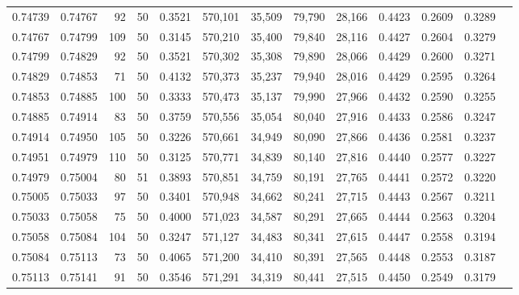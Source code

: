 \begin{tabular}{rrrrrrrrrrrrr}
0.74739 & 0.74767 &    92 &  50 &                                     0.3521 & 570,101 &  35,509 &  79,790 &  28,166 & 0.4423 & 0.2609 & 0.3289 \\
0.74767 & 0.74799 &   109 &  50 &                                     0.3145 & 570,210 &  35,400 &  79,840 &  28,116 & 0.4427 & 0.2604 & 0.3279 \\
0.74799 & 0.74829 &    92 &  50 &                                     0.3521 & 570,302 &  35,308 &  79,890 &  28,066 & 0.4429 & 0.2600 & 0.3271 \\
0.74829 & 0.74853 &    71 &  50 &                                     0.4132 & 570,373 &  35,237 &  79,940 &  28,016 & 0.4429 & 0.2595 & 0.3264 \\
0.74853 & 0.74885 &   100 &  50 &                                     0.3333 & 570,473 &  35,137 &  79,990 &  27,966 & 0.4432 & 0.2590 & 0.3255 \\
0.74885 & 0.74914 &    83 &  50 &                                     0.3759 & 570,556 &  35,054 &  80,040 &  27,916 & 0.4433 & 0.2586 & 0.3247 \\
0.74914 & 0.74950 &   105 &  50 &                                     0.3226 & 570,661 &  34,949 &  80,090 &  27,866 & 0.4436 & 0.2581 & 0.3237 \\
0.74951 & 0.74979 &   110 &  50 &                                     0.3125 & 570,771 &  34,839 &  80,140 &  27,816 & 0.4440 & 0.2577 & 0.3227 \\
0.74979 & 0.75004 &    80 &  51 &                                     0.3893 & 570,851 &  34,759 &  80,191 &  27,765 & 0.4441 & 0.2572 & 0.3220 \\
0.75005 & 0.75033 &    97 &  50 &                                     0.3401 & 570,948 &  34,662 &  80,241 &  27,715 & 0.4443 & 0.2567 & 0.3211 \\
0.75033 & 0.75058 &    75 &  50 &                                     0.4000 & 571,023 &  34,587 &  80,291 &  27,665 & 0.4444 & 0.2563 & 0.3204 \\
0.75058 & 0.75084 &   104 &  50 &                                     0.3247 & 571,127 &  34,483 &  80,341 &  27,615 & 0.4447 & 0.2558 & 0.3194 \\
0.75084 & 0.75113 &    73 &  50 &                                     0.4065 & 571,200 &  34,410 &  80,391 &  27,565 & 0.4448 & 0.2553 & 0.3187 \\
0.75113 & 0.75141 &    91 &  50 &                                     0.3546 & 571,291 &  34,319 &  80,441 &  27,515 & 0.4450 & 0.2549 & 0.3179 \\

\end{tabular}
